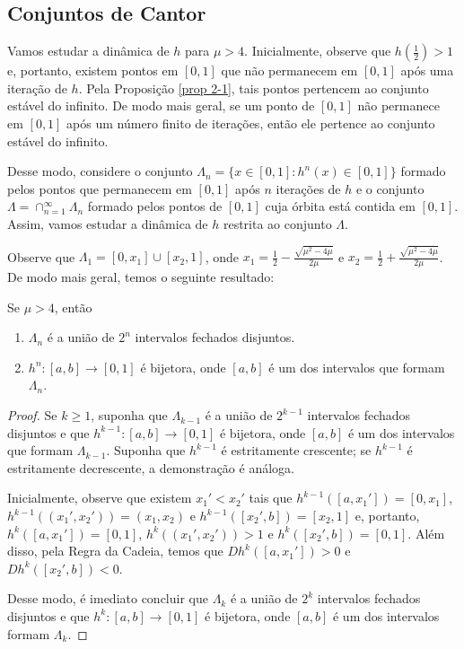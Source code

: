 \subsection{Conjuntos de Cantor}

Vamos estudar a dinâmica de $h$ para $\mu > 4$.
Inicialmente, observe que $h(\frac{1}{2}) > 1$ e, portanto, existem pontos em $[0, 1]$ que não permanecem em $[0, 1]$ após uma iteração de $h$.
Pela Proposição \ref{prop 2-1}, tais pontos pertencem ao conjunto estável do infinito.
De modo mais geral, se um ponto de $[0, 1]$ não permanece em $[0, 1]$ após um número finito de iterações, então ele pertence ao conjunto estável do infinito.

Desse modo, considere o conjunto $\Lambda_n = \lbrace x \in [0, 1] : h^n(x) \in [0, 1] \rbrace$ formado pelos pontos que permanecem em $[0, 1]$ após $n$ iterações de $h$ e o conjunto $\Lambda =  \cap_{n = 1}^\infty \Lambda_n$ formado pelos pontos de $[0, 1]$ cuja órbita está contida em $[0, 1]$. Assim, vamos estudar a dinâmica de $h$ restrita ao conjunto $\Lambda$.

Observe que $\Lambda_1 = [0, x_1] \cup [x_2, 1]$, onde $x_1 = \frac{1}{2} - \frac{\sqrt{\mu^2 - 4\mu}}{2\mu}$ e $x_2 = \frac{1}{2} + \frac{\sqrt{\mu^2 - 4\mu}}{2\mu}$. De modo mais geral, temos o seguinte resultado:

\begin{proposition}
Se $\mu > 4$, então
\begin{enumerate}
\item $\Lambda_n$ é a união de $2^n$ intervalos fechados disjuntos.
\item $h^n: [a, b] \to [0, 1]$ é bijetora, onde $[a, b]$ é um dos intervalos que formam $\Lambda_n$.
\end{enumerate}
\end{proposition}

\begin{proof}
Se $k \geq 1$, suponha que $\Lambda_{k-1}$ é a união de $2^{k-1}$ intervalos fechados disjuntos e que $h^{k-1}: [a, b] \to [0, 1]$ é bijetora, onde $[a, b]$ é um dos intervalos que formam $\Lambda_{k-1}$.
Suponha que $h^{k-1}$ é estritamente crescente; se $h^{k-1}$ é estritamente decrescente, a demonstração é análoga.

Inicialmente, observe que existem $x_1' < x_2'$ tais que $h^{k-1}([a, x_1']) = [0, x_1]$, $h^{k-1}((x_1', x_2')) = (x_1, x_2)$ e $h^{k-1}([x_2', b]) = [x_2, 1]$ e, portanto, $h^k([a, x_1']) = [0, 1]$, $h^k((x_1', x_2')) > 1$  e $h^k([x_2', b]) = [0, 1]$.
Além disso, pela Regra da Cadeia, temos que $D h^k([a, x_1']) > 0$ e $D h^k([x_2', b]) < 0$.

Desse modo, é imediato concluir que $\Lambda_k$ é a união de $2^k$ intervalos fechados disjuntos e que $h^k: [a, b] \to [0, 1]$ é bijetora, onde $[a, b]$ é um dos intervalos formam $\Lambda_k$.
\end{proof}


